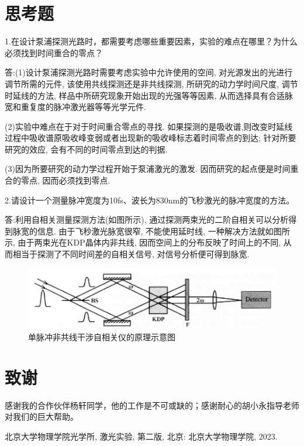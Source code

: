 \documentclass[aps,pre,12pt,preprint,%
	onecolumn,showpacs,showkeys,nofootinbib]{revtex4-2}
\begin{document}
\section{思考题}
1.在设计泵浦探测光路时，都需要考虑哪些重要因素，实验的难点在哪里？为什么必须找到时间重合的零点？ 
\par 答:(1)设计泵浦探测光路时需要考虑实验中允许使用的空间, 对光源发出的光进行调节所需的元件, 该使用共线探测还是非共线探测, 所研究的动力学时间尺度, 调节时延线的方法, 样品中所研究现象开始出现的光强等等因素, 从而选择具有合适脉宽和重复度的脉冲激光器等等光学元件.

(2)实验中难点在于对于时间重合零点的寻找. 如果探测的是吸收谱,则改变时延线过程中吸收谱原吸收峰变弱或者出现新的吸收峰标志着时间零点的到达; 针对所要研究的效应, 会有不同的时间零点到达的判据. 

(3)因为所要研究的动力学过程开始于泵浦激光的激发. 因而研究的起点便是时间重合的零点, 因而必须找到零点.

2.请设计一个测量脉冲宽度为10fs、波长为830nm的飞秒激光的脉冲宽度的方法。
\par 答:利用自相关测量探测方法(如图所示), 通过探测两束光的二阶自相关可以分析得到脉宽的信息. 由于飞秒激光脉宽很窄, 不能使用延时线, 一种解决方法就如图所示, 由于两束光在KDP晶体内非共线, 因而空间上的分布反映了时间上的不同, 从而相当于探测了不同时间差的自相关信号, 对信号分析便可得到脉宽.
	\begin{figure}[!h]
	\centering
	\includegraphics[width=.8\linewidth]{img/3.png}
	\caption[单脉冲非共线干涉自相关仪的原理示意图]{单脉冲非共线干涉自相关仪的原理示意图}\vspace{1ex}
	\end{figure}
\section{致谢}
	感谢我的合作伙伴杨轩同学，他的工作是不可或缺的；感谢耐心的胡小永指导老师对我们的巨大帮助。
\begin{thebibliography}{99}
	北京大学物理学院光学所, 激光实验, 第二版, 北京: 北京大学物理学院, 2023.
\end{thebibliography}
\clearpage
\end{document}
